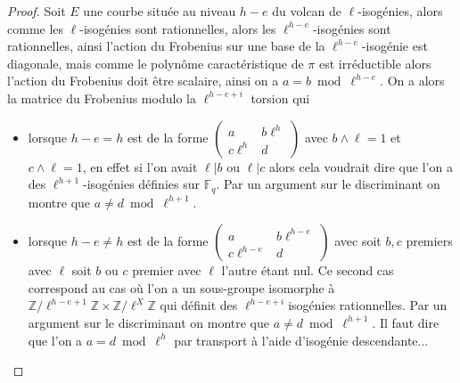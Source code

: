 \documentclass[10pt,a4paper]{book}
\theoremstyle{plain}
\theoremstyle{definition}
\theoremstyle{definition}
\theoremstyle{definition}
\theoremstyle{definition}
\theoremstyle{remark}
\theoremstyle{remark}
\theoremstyle{definition}
\begin{document}
\begin{proof}
Soit $E$ une courbe située au niveau $h-e$ du volcan de $\ell$-isogénies, alors
comme les $\ell$-isogénies sont rationnelles, alors les $\ell^{h-e}$-isogénies 
sont rationnelles, ainsi l'action du Frobenius sur une base de la 
$\ell^{h-e}$-isogénie est diagonale, mais comme le polynôme caractéristique de 
$\pi$ est irréductible alors l'action du Frobenius doit être scalaire, ainsi on
a $a=b \bmod \ell^{h-e}$.
On a alors la matrice du Frobenius modulo la $\ell^{h-e+i}$ torsion qui  
\begin{itemize}
\item lorsque $h-e=h$ est de la forme $\left ( \begin{smallmatrix}a & b\ell^{h}\\c\ell^{h} & d
\end{smallmatrix}\right )$ avec $b \wedge \ell=1$ et $c \wedge \ell=1$, en 
effet si l'on avait $\ell | b$ ou $\ell |c$ alors cela voudrait dire que l'on a
des $\ell^{h+1}$-isogénies définies sur $\mathbb{F}_q$. Par un argument sur
le discriminant on montre que $a \neq  d \bmod \ell^{h+1}$. 
\item lorsque $h-e \neq h$ est de la forme  $\left ( \begin{smallmatrix}a & b\ell^{h-e}\\ c\ell^{h-e}  & d
\end{smallmatrix}\right )$ avec soit $b, c$ premiers avec $\ell$ soit $b$ ou $c$ premier avec $\ell$ l'autre étant nul. Ce second cas correspond au cas où l'on a un sous-groupe isomorphe à $\mathbb{Z}/\ell^{h-e+1} \mathbb{Z} \times \mathbb{Z}/\ell^{X}\mathbb{Z}$ qui définit des $\ell^{h-e+i}$isogénies 
rationnelles.  Par un argument sur le discriminant on montre que $a \neq  d \bmod \ell^{h+1}$. Il faut dire que l'on a $a=d \bmod \ell^h$ par transport à l'aide d'isogénie descendante...
\end{itemize}


\end{proof}
\end{document}
